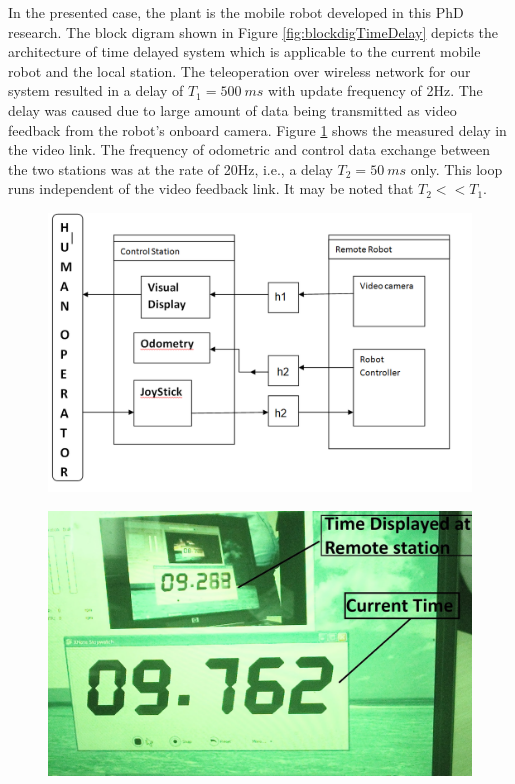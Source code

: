  In the presented case, the plant is the mobile robot developed in this PhD research. The block digram shown in Figure \ref{fig:blockdigTimeDelay} depicts the architecture of time delayed system which is applicable to the current mobile robot and the local station. The teleoperation  over wireless network for our system   resulted in a delay of $T_1= 500~ms$ with update frequency of 2Hz.  The delay was caused due to large amount of data being transmitted as  video feedback from the robot's onboard camera. Figure \ref{fig:delayphoto} shows the measured delay in the video link. The frequency of odometric and control  data exchange between the two stations was at the rate of 20Hz, i.e., a delay $T_2=50~ms$ only. This  loop runs  independent of the video feedback link.  It may be noted that $T_2<<T_1$.
 \begin{figure}[ht]
 	\centering
 	\begin{minipage}{0.55\textwidth}
 		\centering
 		\includegraphics[width=.9\linewidth,keepaspectratio]{Chapter7/fig/BlockTimeDelay}
 		\label{fig:blockdigTimeDelay}
 	\end{minipage}
  	\begin{minipage}{0.40\textwidth}
 	\centering
 	\includegraphics[width=\linewidth,keepaspectratio]{Chapter7/fig/delayMeasureNew}
 	\label{fig:delayphoto}
 \end{minipage}%
 \end{figure} 



